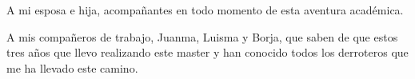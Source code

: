 A mi esposa e hija, acompañantes en todo momento de esta aventura académica.

A mis compañeros de trabajo, Juanma, Luisma y Borja, que saben de que estos tres años que llevo realizando este master y han conocido todos los derroteros que me ha llevado este camino.